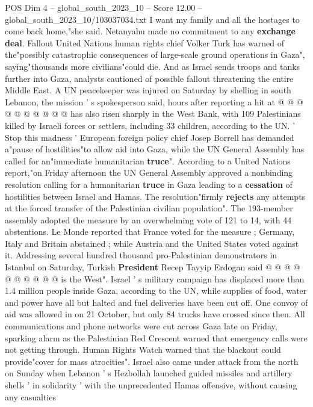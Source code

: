 \begin{textsample}{POS Dim 4 – global\_south\_2023\_10 – Score 12.00 – global\_south\_2023\_10/103037034.txt}
I want my family and all the hostages to come back home,"she said.
Netanyahu made no commitment to any \textbf{exchange} \textbf{deal}.
Fallout United Nations human rights chief Volker Turk has warned of the"possibly catastrophic consequences of large-scale ground operations in Gaza", saying"thousands more civilians"could die.
And as Israel sends troops and tanks further into Gaza, analysts cautioned of possible fallout threatening the entire Middle East.
A UN peacekeeper was injured on Saturday by shelling in south Lebanon, the mission ' s spokesperson said, hours after reporting a hit at @ @ @ @ @ @ @ @ @ @ has also risen sharply in the West Bank, with 109 Palestinians killed by Israeli forces or settlers, including 33 children, according to the UN. ' Stop this madness ' European foreign policy chief Josep Borrell has demanded a"pause of hostilities"to allow aid into Gaza, while the UN General Assembly has called for an"immediate humanitarian \textbf{truce}".
According to a United Nations report,"on Friday afternoon the UN General Assembly approved a nonbinding resolution calling for a humanitarian \textbf{truce} in Gaza leading to a \textbf{cessation} of hostilities between Israel and Hamas.
The resolution"firmly \textbf{rejects} any attempts at the forced transfer of the Palestinian civilian population".
The 193-member assembly adopted the measure by an overwhelming vote of 121 to 14, with 44 abstentions.
Le Monde reported that France voted for the measure ; Germany, Italy and Britain abstained ; while Austria and the United States voted against it.
Addressing several hundred thousand pro-Palestinian demonstrators in Istanbul on Saturday, Turkish \textbf{President} Recep Tayyip Erdogan said @ @ @ @ @ @ @ @ @ @ is the West".
Israel ' s military campaign has displaced more than 1.4 million people inside Gaza, according to the UN, while supplies of food, water and power have all but halted and fuel deliveries have been cut off.
One convoy of aid was allowed in on 21 October, but only 84 trucks have crossed since then.
All communications and phone networks were cut across Gaza late on Friday, sparking alarm as the Palestinian Red Crescent warned that emergency calls were not getting through.
Human Rights Watch warned that the blackout could provide"cover for mass atrocities".
Israel also came under attack from the north on Sunday when Lebanon ' s Hezbollah launched guided missiles and artillery shells ' in solidarity ' with the unprecedented Hamas offensive, without causing any casualties

\end{textsample}
